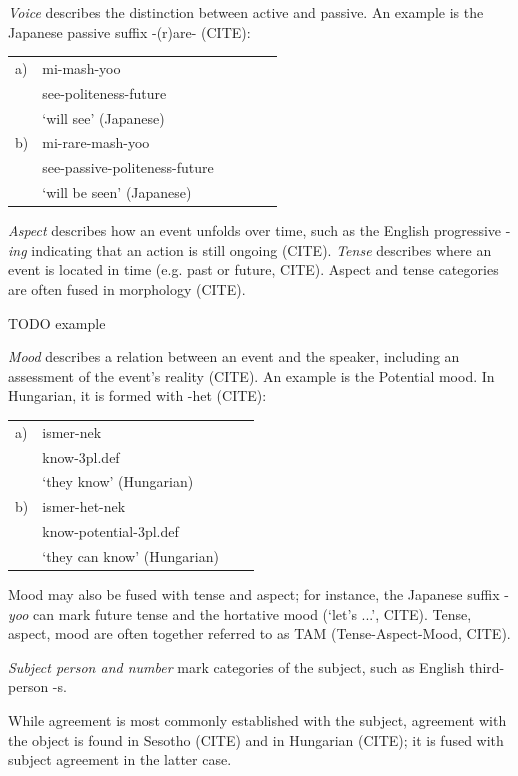 \documentclass[11pt,letterpaper]{article}
\begin{document}
\textit{Voice} describes the distinction between active and passive. An example is the Japanese passive suffix -(r)are- (CITE):

\begin{tabular}{llllll}
a) & mi-mash-yoo \\
& see-politeness-future \\
& `will see' (Japanese) \\
b) & mi-rare-mash-yoo \\
& see-passive-politeness-future \\
&`will be seen' (Japanese)
\end{tabular}



\textit{Aspect} describes how an event unfolds over time, such as the English progressive -\textit{ing} indicating that an action  is still ongoing (CITE).
\textit{Tense} describes where an event is located in time (e.g. past or future, CITE).
Aspect and tense categories are often fused in morphology (CITE).

TODO example

\textit{Mood} describes a relation between an event and the speaker, including an assessment of the event's reality (CITE).
An example is the Potential mood. In Hungarian, it is formed with -het (CITE): 

\begin{tabular}{llll}
a) & ismer-nek \\
& know-3pl.def \\
& `they know' (Hungarian) \\
b) & ismer-het-nek \\
& know-potential-3pl.def \\
& `they can know' (Hungarian)
\end{tabular}

Mood may also be fused with tense and aspect; for instance, the Japanese suffix -\textit{yoo} can mark future tense and the hortative mood (`let's ...', CITE).
Tense, aspect, mood are often together referred to as TAM (Tense-Aspect-Mood, CITE).

\textit{Subject person and number} mark categories of the subject, such as English third-person -s.

While agreement is most commonly established with the subject, agreement with the object is found in Sesotho (CITE) and in Hungarian (CITE); it is fused with subject agreement in the latter case.
\end{document}
